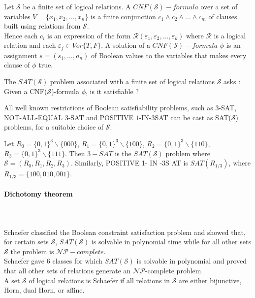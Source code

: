 \begin{defn}
Let $\mathcal{S}$ be a finite set of logical relations. A  $CNF(\mathcal{S})-formula$ over a set of variables $V = \{x_1,x_2,\dots,x_n   \}$  is a finite conjunction $c_1 \wedge c_2 \wedge \dots \wedge c_m$ of clauses built using relations from $\mathcal{S}$. \\
Hence each $c_i$ is an expression of the form $\mathcal{R}(\varepsilon_1,\varepsilon_2,\dots,\varepsilon_k)$ where $\mathcal{R}$ is a logical relation and each $\varepsilon_j \in V or \{T,F\}$. A solution of a $CNF(\mathcal{S})-formula$ $\phi$ is an assignment $s = (s_1, \dots, a_n)$ of Boolean values to the variables that makes every clause of $\phi$ true. 
\end{defn}

\begin{defn}
The $SAT(\mathcal{S})$ problem associated with a finite set of logical relations $\mathcal{S}$ asks : 
Given a CNF($\mathcal{S}$)-formula $\phi$, is it satisfiable ?
\end{defn}

\begin{remark}
All well known restrictions of Boolean satisfiability problems, such as $3$-SAT, NOT-ALL-EQUAL $3$-SAT and POSITIVE $1$-IN-$3$SAT can be cast as SAT($\mathcal{S}$) problems, for a suitable choice of $\mathcal{S}$. 
\end{remark}

\begin{example}
Let $R_0 = \{0,1\}^{3} \backslash \{000\}$,
$R_1 = \{0, 1\}^{3} \backslash\{100\}$, $R_2 = \{0,1\}^{3} \backslash\{110\}$, $R_3 = \{0,1\}^{3} \backslash\{111\}$. Then $3-SAT$ is the $SAT(\mathcal{S})$ problem where $\mathcal{S} =   ({R_0 , R_1 , R_2 , R_3 })$. Similarly, POSITIVE 1- IN -3S AT is $SAT({R_{1/3}})$, where $R_{1/3} = \{100, 010, 001\}$.
\end{example}

\paragraph{Dichotomy theorem} \\ [breakline]
\\
Schaefer classified the Boolean constraint satisfaction problem and showed that, for certain sets $\mathcal{S}$, $SAT(\mathcal{S})$ is solvable in polynomial time while for all other sets $\mathcal{S}$ the problem is $\mathcal{NP}-complete$. \\ 
Schaefer gave $6$ classes for which $SAT(\mathcal{S})$ is solvable in polynomial and proved that all other sets of relations generate an $\mathcal{NP}$-complete problem. \\ 
A set $\mathcal{S}$ of logical relations is Schaefer if all relations in $\mathcal{S}$ are either bijunctive, Horn, dual Horn, or affine. \cite{schaefer_complexity_1978}

